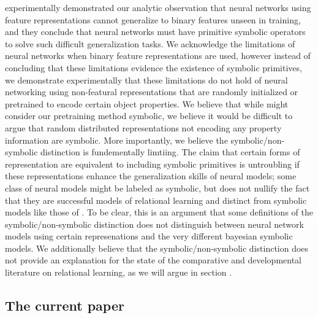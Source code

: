 \documentclass{article}
\begin{document}
{ \citep{marcus:2001,marcus:1999} experimentally demonstrated our analytic observation that neural networks using feature representations cannot generalize to binary features unseen in training, and they conclude that neural networks must have primitive symbolic operators to solve such difficult generalization tasks. We acknowledge the limitations of neural networks when binary feature representations are used, however instead of concluding that these limitations evidence the existence of symbolic primitives, we demonstrate experimentally that these limitations do not hold of neural networking using non-featural representations that are randomly initialized or pretrained to encode certain object properties. We believe that while \citeauthor{marcus:2001} might consider our pretraining method symbolic, we believe it would be difficult to argue that random distributed representations not encoding any property information are symbolic. More importantly, we believe the symbolic/non-symbolic distinction is fundementally limtiing. The claim that certain forms of representation are equivalent to including symbolic primitives is untroubling if these representations enhance the generalization skills of neural models; some class of neural models might be labeled as symbolic, but does not nullify the fact that they are successful models of relational learning and distinct from symbolic models like those of \citealt{frank:2011}. To be clear, this is an argument that some definitions of the symbolic/non-symbolic distinction does not distinguish between neural network models using certain represenations and the very different bayesian symbolic models. We additionally believe that the symbolic/non-symbolic distinction does not provide an explanation for the state of the comparative and developmental literature on relational learning, as we will argue in section .
}


\subsection{The current paper}
\end{document}
